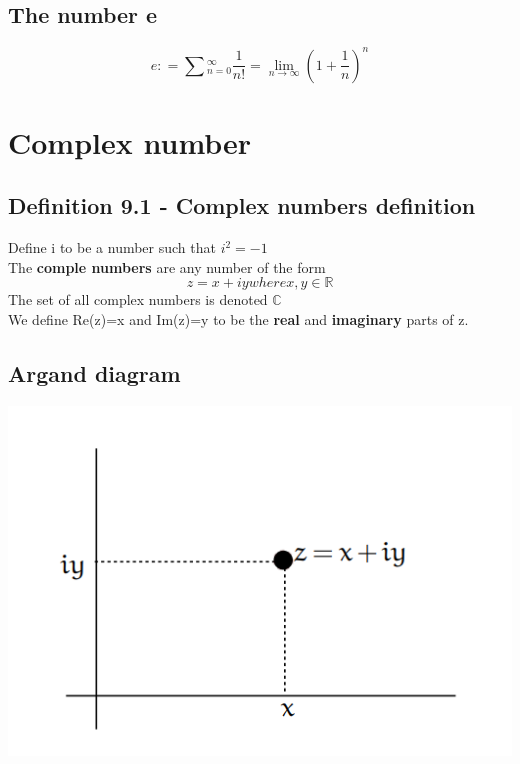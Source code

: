 \documentclass{article}
\begin{document}
\subsection{The number e}
\begin{equation}
    e: = {\sum{^{\infty}_{n=0}}\frac{1}{n!}} = \lim_{n \rightarrow \infty}(1+\frac{1}{n})^{n}
\end{equation}

\newpage

\section{Complex number}
\subsection{Definition 9.1 - Complex numbers definition}
Define i to be a number such that $i^2 = -1$ \\
The \textbf{comple numbers} are any number of the form 
\begin{equation}
    z=x+iy where x,y \in \mathbb{R}
\end{equation}
The set of all complex numbers is denoted $\mathbb{C}$\\
We define Re(z)=x and Im(z)=y to be the \textbf{real} and \textbf{imaginary} parts of z.\\

\subsection{Argand diagram}
\begin{center}
    \centering\includegraphics[scale = 0.6]{Graph 9.0}\\
\end{center}
\end{document}

